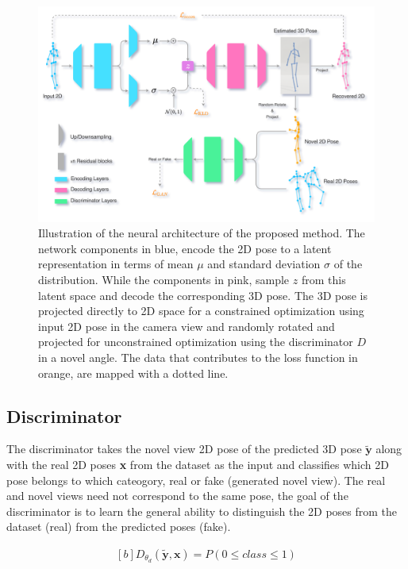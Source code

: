 \begin{figure}[h] \label{fig:method_arch}
    \centering
    \includegraphics[width=\textwidth]{figures/arch/method_arch.png}
    \caption{Illustration of the neural architecture of the proposed method. The network components in blue, encode the 2D pose to a latent representation in terms of mean $\mu$ and standard deviation $\sigma$ of the distribution. While the components in pink, sample $z$ from this latent space and decode the corresponding 3D pose. The 3D pose is projected directly to 2D space for a constrained optimization using input 2D pose in the camera view and randomly rotated and projected for unconstrained optimization using the discriminator $D$ in a novel angle. The data that contributes to the loss function in orange, are mapped with a dotted line.
    }
\end{figure}

\subsection{Discriminator}
The discriminator takes the novel view 2D pose of the predicted 3D pose $\tilde{\textbf{y}}$ along with the real 2D poses \textbf{x} from the dataset as the input and classifies which 2D pose belongs to which cateogory, real or fake (generated novel view). The real and novel views need not correspond to the same pose, the goal of the discriminator is to learn the general ability to distinguish the 2D poses from the dataset (real) from the predicted poses (fake).

\begin{equation} \label{eqn:proj_rotated}
    \begin{gathered}[b]
        D_{\theta_d}(\tilde{\textbf{y}}, \textbf{x}) = P(0\leq class \leq 1)
    \end{gathered}
\end{equation}


